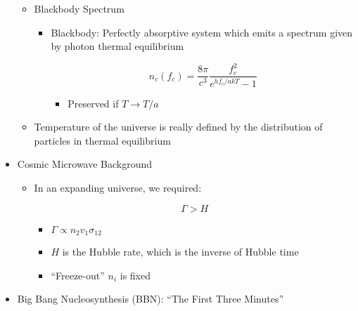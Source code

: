 \begin{itemize}
\begin{itemize}
\begin{itemize}
        \end{itemize}

      \item Blackbody Spectrum

        \begin{itemize}

          \item Blackbody: Perfectly absorptive system which emits a spectrum given by photon thermal equilibrium

            $$n_c(f_c)=\frac{8\pi}{c^3}\frac{f_c^2}{e^{hf_c/akT}-1}$$

            \begin{itemize}

              \item Preserved if $T\to T/a$

            \end{itemize}

        \end{itemize}

      \item Temperature of the universe is really defined by the distribution of particles in thermal equilibrium

    \end{itemize}

  \item Cosmic Microwave Background

    \begin{itemize}
        
      \item In an expanding universe, we required:

        $$\Gamma>H$$

        \begin{itemize}

          \item $\Gamma\propto n_2v_1\sigma_{12}$

          \item $H$ is the Hubble rate, which is the inverse of Hubble time

          \item ``Freeze-out'' $n_i$ is fixed

        \end{itemize}

    \end{itemize}

  \item Big Bang Nucleosynthesis (BBN): ``The First Three Minutes''


\end{itemize}
